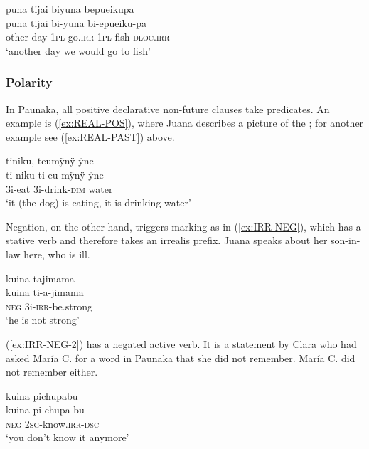 \ea\label{ex:IRR-HAB-PAST}
\begingl 
\glpreamble puna tijai biyuna bepueikupa\\
\gla puna tijai bi-yuna bi-epueiku-pa\\ 
\glb other day 1\textsc{pl}-go.\textsc{irr} 1\textsc{pl}-fish-\textsc{dloc.irr}\\ 
\glft ‘another day we would go to fish’
 \trailingcitation{[jxx-p120430l-1.060]}
\xe
{}

\subsubsection{Polarity}\label{par:Polarity}
\largerpage
In Paunaka, all positive declarative non-future clauses take  predicates. An example is (\ref{ex:REAL-POS}), where Juana describes a picture of the ; for another example see (\ref{ex:REAL-PAST}) above.

\ea\label{ex:REAL-POS}
\begingl 
\glpreamble tiniku, teumÿnÿ ÿne\\
\gla ti-niku ti-eu-mÿnÿ ÿne\\ 
\glb 3i-eat 3i-drink-\textsc{dim} water\\ 
\glft ‘it (the dog) is eating, it is drinking water’
 \trailingcitation{[jxx-a120516l-a.018]}
\xe

Negation, on the other hand, triggers  marking as in (\ref{ex:IRR-NEG}), which has a stative verb and therefore takes an irrealis prefix. Juana speaks about her son-in-law here, who is ill.

\ea\label{ex:IRR-NEG}
\begingl 
\glpreamble kuina tajimama\\
\gla kuina ti-a-jimama\\ 
\glb \textsc{neg} 3i-\textsc{irr}-be.strong\\ 
\glft ‘he is not strong’
 \trailingcitation{[jxx-p110923l-1.053]}
\xe

(\ref{ex:IRR-NEG-2}) has a negated active verb. It is a statement by Clara who had asked María C. for a word in Paunaka that she did not remember. María C. did not remember either.

\ea\label{ex:IRR-NEG-2}
\begingl
\glpreamble kuina pichupabu\\
\gla kuina pi-chupa-bu\\
\glb \textsc{neg} 2\textsc{sg}-know.\textsc{irr}-\textsc{dsc}\\
\glft ‘you don’t know it anymore’
\endgl
 \trailingcitation{[cux-c120414ls-2.243]}
\xe

